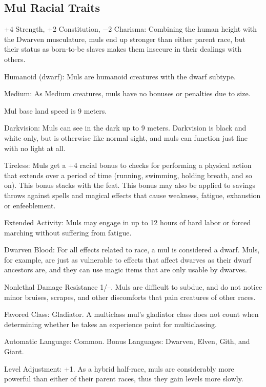 \subsection{Mul Racial Traits}
\begin{itemize*}
    \item +4 Strength, +2 Constitution, $-2$ Charisma: Combining the human height with the Dwarven musculature, muls end up stronger than either parent race, but their status as born-to-be slaves makes them insecure in their dealings with others.
    \item Humanoid (dwarf): Muls are humanoid creatures with the dwarf subtype.
    \item Medium: As Medium creatures, muls have no bonuses or penalties due to size.
    \item Mul base land speed is 9 meters.
    \item Darkvision: Muls can see in the dark up to 9 meters. Darkvision is black and white only, but is otherwise like normal sight, and muls can function just fine with no light at all.
    \item Tireless: Muls get a +4 racial bonus to checks for performing a physical action that extends over a period of time (running, swimming, holding breath, and so on). This bonus stacks with the  feat. This bonus may also be applied to savings throws against spells and magical effects that cause weakness, fatigue, exhaustion or enfeeblement.
    \item Extended Activity: Muls may engage in up to 12 hours of hard labor or forced marching without suffering from fatigue.
    \item Dwarven Blood: For all effects related to race, a mul is considered a dwarf. Muls, for example, are just as vulnerable to effects that affect dwarves as their dwarf ancestors are, and they can use magic items that are only usable by dwarves.
    \item Nonlethal Damage Resistance 1/--. Muls are difficult to subdue, and do not notice minor bruises, scrapes, and other discomforts that pain creatures of other races.
    \item Favored Class: Gladiator. A multiclass mul's gladiator class does not count when determining whether he takes an experience point for multiclassing.
    \item Automatic Language: Common. Bonus Languages: Dwarven, Elven, Gith, and Giant.
    \item Level Adjustment: +1. As a hybrid half-race, muls are considerably more powerful than either of their parent races, thus they gain levels more slowly.
\end{itemize*}